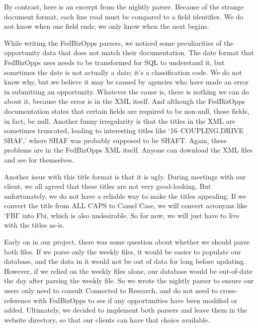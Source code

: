 \documentclass[onecolumn]{IEEEtran}
\begin{document}
By contrast, here is an excerpt from the nightly parser. Because of the strange document format, each line read must be compared to a field identifier. We do not know when one field ends; we only know when the next begins.


While writing the FedBizOpps parsers, we noticed some peculiarities of the opportunity data that does not match their documentation. The date format that FedBizOpps uses needs to be transformed for SQL to understand it, but sometimes the date is not actually a date; it's a classification code. We do not know why, but we believe it may be caused by agencies who have made an error in submitting an opportunity. Whatever the cause is, there is nothing we can do about it, because the error is in the XML itself. And although the FedBizOpps documentation states that certain fields are required to be non-null, those fields, in fact, be null. Another funny irregularity is that the titles in the XML are sometimes truncated, leading to interesting titles like `16--COUPLING,DRIVE SHAF,' where SHAF was probably supposed to be SHAFT. Again, these problems are in the FedBizOpps XML itself. Anyone can download the XML files and see for themselves. 

Another issue with this title format is that it is ugly. During meetings with our client, we all agreed that these titles are not very good-looking. But unfortunately, we do not have a reliable way to make the titles appealing. If we convert the title from ALL CAPS to Camel Case, we will convert acronyms like `FBI' into Fbi, which is also undesirable. So for now, we will just have to live with the titles as-is.

Early on in our project, there was some question about whether we should parse both files. If we parse only the weekly files, it would be easier to populate our database, and the data in it would not be out of data for long before updating. However, if we relied on the weekly files alone, our database would be out-of-date the day after parsing the weekly file. So we wrote the nightly parser to ensure our users only need to consult Connected to Research, and do not need to cross-reference with FedBizOpps to see if any opportunities have been modified or added. Ultimately, we decided to implement both parsers and leave them in the website directory, so that our clients can have that choice available.
\end{document}
